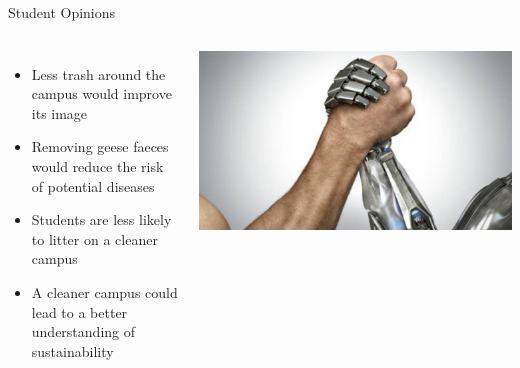 \documentclass[18pt]{beamer}
\begin{document}
    \begin{frame}{Student Opinions}
        \begin{columns}
            \begin{itemize}
                \item Less trash around the campus would improve its image
                \item Removing geese faeces would reduce the risk of potential diseases
                \item Students are less likely to litter on a cleaner campus
                \item A cleaner campus could lead to a better understanding of sustainability
            \end{itemize}
            \includegraphics[width=0.99\columnwidth]{humanvsrobot}
        \end{columns}
    \end{frame}
\end{document}
